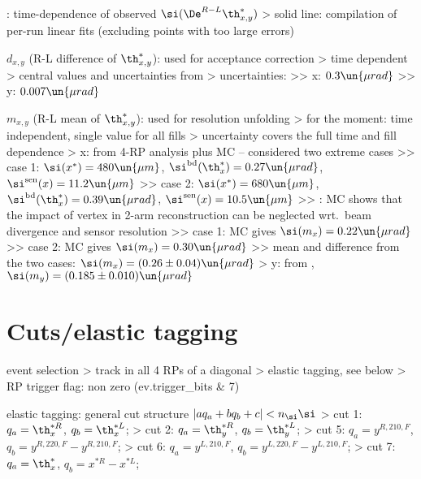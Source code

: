 \>  : time-dependence of observed $\si(\De^{R-L} \th_{x, y}^*)$
\>> solid line: compilation of per-run linear fits (excluding points with too large errors)

\> $d_{x, y}$ (R-L difference of $\th_{x, y}^*$): used for acceptance correction
\>> time dependent
\>> central values and uncertainties from 
\>> uncertainties:
\>>> x: $0.3\un{\mu rad}$
\>>> y: $0.007\un{\mu rad}$

\> $m_{x, y}$ (R-L mean of $\th_{x, y}^*$): used for resolution unfolding
\>> for the moment: time independent, single value for all fills
\>> uncertainty covers the full time and fill dependence
\>> x: from 4-RP analysis plus MC -- considered two extreme cases
\>>> case 1: $\si(x^*) = 480\un{\mu m}$, $\si^{\rm bd}(\th^*_x) = 0.27\un{\mu rad}$, $\si^{\rm sen}(x) = 11.2\un{\mu m}$
\>>> case 2: $\si(x^*) = 680\un{\mu m}$, $\si^{\rm bd}(\th^*_x) = 0.39\un{\mu rad}$, $\si^{\rm sen}(x) = 10.5\un{\mu m}$
\>>> : MC shows that the impact of vertex in 2-arm reconstruction can be neglected wrt.~beam divergence and sensor resolution
\>>> case 1: MC gives $\si(m_x) = 0.22\un{\mu rad}$
\>>> case 2: MC gives $\si(m_x) = 0.30\un{\mu rad}$
\>>> mean and difference from the two cases: $\si(m_x) = (0.26 \pm 0.04)\un{\mu rad}$
\>> y: from , $\si(m_y) = (0.185 \pm 0.010)\un{\mu rad}$




\section{Cuts/elastic tagging}

\> event selection
\>> track in all 4 RPs of a diagonal
\>> elastic tagging, see below
\>> RP trigger flag: non zero (ev.trigger\_bits \& 7)

\> elastic tagging: general cut structure $| a q_a + b q_b + c| < n_\si  \si$
\>> cut 1: $q_a = \th_x^{*R}$, $q_b = \th_x^{*L}$; 
\>> cut 2: $q_a = \th_y^{*R}$, $q_b = \th_y^{*L}$; 
\>> cut 5: $q_a = y^{R,210,F}$, $q_b = y^{R,220,F} - y^{R,210,F}$; 
\>> cut 6: $q_a = y^{L,210,F}$, $q_b = y^{L,220,F} - y^{L,210,F}$; 
\>> cut 7: $q_a = \th_x^*$, $q_b = x^{*R} - x^{*L}$; 

